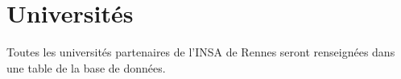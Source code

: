 \chapter{Universités}
\label{chap::universites}
Toutes les universités partenaires de l'INSA de Rennes seront renseignées dans une table de la base de données. 